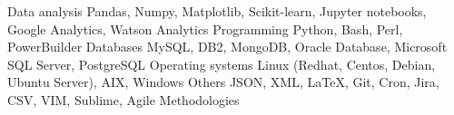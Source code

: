 %
%
%

    \begin{keywords}
        \keywordsentry
            {Data analysis}
            {
                Pandas,
                Numpy,
                Matplotlib,
                Scikit-learn,
                Jupyter notebooks,
                Google Analytics,
                Watson Analytics
            }
        \keywordsentry
            {Programming}
            {
                Python,
                Bash,
                Perl,
                PowerBuilder
            }
        \keywordsentry
            {Databases}
            {
                MySQL,
                DB2,
                MongoDB,
                Oracle Database, 
                Microsoft SQL Server,
                PostgreSQL
            }
        \keywordsentry
            {Operating systems}
            {
                Linux (Redhat, Centos, Debian, Ubuntu Server),
                AIX,
                Windows
            }
        \keywordsentry
            {Others}
            {
                JSON,
                XML,
                \LaTeX,
                Git,
                Cron,
                Jira,
                CSV,
                VIM, 
                Sublime,
                Agile Methodologies
            }
    \end{keywords}
